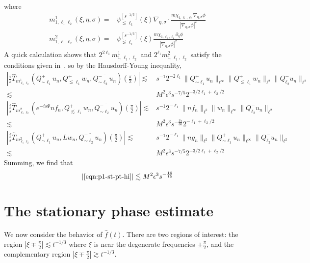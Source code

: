 \documentclass[letterpaper, reqno,final]{amsart}
\newcommand{\fhPi}{\frac{\pi}{2}}
\newcommand{\discrAvg}{\Psi}
\newcommand{\invLinProp}[1][t]{e^{-i#1\discrAvg}}
\newcommand{\deles}{\nabla_{\eta,\sigma}}
\begin{document}
where
\begin{equation*}\begin{split}
    m^1_{1,\ell_1 \ell_2}(\xi,\eta,\sigma) =& \psi^{[s^{-1/3}]}_{\lesssim \ell_1}(\xi) \deles \cdot \frac{m\chi_{1,\ell_1, \ell_2} \deles \phi}{|\deles \phi|^2}\\
    m^2_{1,\ell_1 \ell_2}(\xi,\eta,\sigma) =& \psi^{[s^{-1/3}]}_{\lesssim \ell_1}(\xi)\frac{m\chi_{1,\ell_1, \ell_2} \partial_\eta \phi}{|\deles \phi|^2}
\end{split}\end{equation*}
A quick calculation shows that $2^{2\ell_1} m^1_{1,\ell_1, \ell_2}$ and $2^{\ell_1} m^2_{1,\ell_1, \ell_2}$ satisfy the conditions given in~, so by the Hausdorff-Young inequality,
\begin{equation*}\begin{split}
    \left|\frac{i}{s}\hat{T}_{m^1_{\ell_1\ell_2}}(Q_{\sim \ell_1}^{+} u_n,Q_{\lesssim \ell_1}^{+}w_n,\overline{Q_{\sim \ell_2}^{-}u_n})(\fhPi) \right| \lesssim& s^{-1} 2^{-2\ell_1} \lVert Q_{\sim \ell_1}^{+} u_n \rVert_{\ell^\infty} \lVert Q_{\lesssim \ell_1}^{+}w_n \rVert_{\ell^2} \lVert Q_{\ell_2}^{-} u_n \rVert_{\ell^2}\\
    \lesssim& M^2 \epsilon^3 s^{-7/5} 2^{-3/2 \ell_1 + \ell_2/2}\\
    \left|\frac{i}{s}\hat{T}_{m^2_{\ell_1\ell_2}}(\invLinProp[s] n f_n,Q_{\lesssim \ell_1}^{+}w_n,\overline{Q_{\sim \ell_2}^{-}u_n})(\fhPi) \right| \lesssim& s^{-1} 2^{-\ell_1} \lVert nf_n \rVert_{\ell^2} \lVert w_n \rVert_{\ell^\infty} \lVert Q_{\ell_2}^{-} u_n \rVert_{\ell^2}\\
    \lesssim& M^2 \epsilon^3 s^{-\frac{37}{30}} 2^{-\ell_1 + \ell_2/2}\\
    \left|\frac{i}{s}\hat{T}_{m^2_{\ell_1\ell_2}}(Q^+_{\sim \ell_1} u_n,Lw_n,\overline{Q_{\sim \ell_2}^{-}u_n})(\fhPi) \right| \lesssim& s^{-1} 2^{-\ell_1} \lVert ng_n \rVert_{\ell^2} \lVert Q^+_{\sim \ell_1} u_n \rVert_{\ell^\infty} \lVert Q_{\ell_2}^{-} u_n \rVert_{\ell^2}\\
    \lesssim& M^2 \epsilon^3 s^{-7/5} 2^{-3/2\ell_1 + \ell_2/2}
\end{split}\end{equation*}
Summing, we find that
\begin{equation*}
    |\eqref{eqn:p1-st-pt-hi}| \lesssim M^2\epsilon^3 s^{-\frac{16}{15}}
\end{equation*}

\section{The stationary phase estimate\label{sec:L-infty}}
We now consider the behavior of $\hat f(t)$.  There are two regions of interest: the region $|\xi \mp \fhPi| \lesssim t^{-1/3}$ where $\xi$ is near the degenerate frequencies $\pm \fhPi$, and the complementary region $|\xi \mp \fhPi| \gtrsim t^{-1/3}$.
\end{document}
